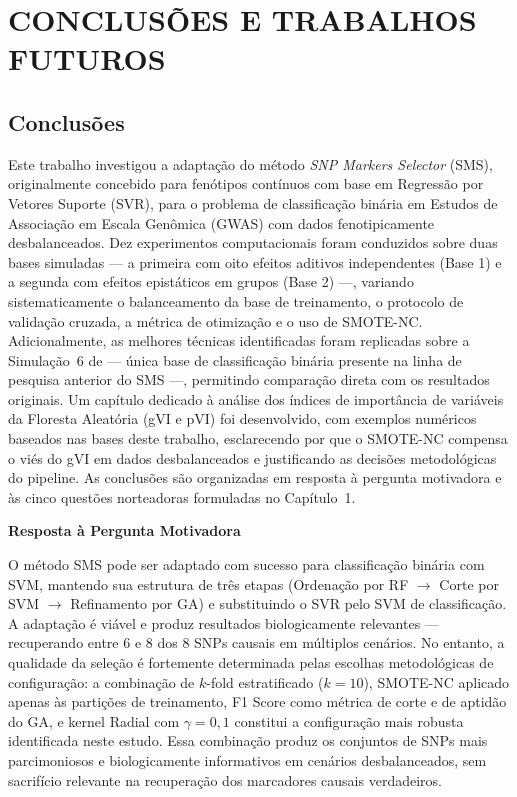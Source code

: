 \documentclass[
    12pt,
    a4paper,
    oneside,
    english,
    french,
    spanish,
    brazil
    ]{abntex2}
\newcommand{\novo}[1]{\textcolor{corNova}{#1}}
\begin{document}
\chapter{\textbf{CONCLUSÕES E TRABALHOS FUTUROS}}
\label{cap:conclusoes}

\section*{Conclusões}

Este trabalho investigou a adaptação do método \textit{SNP Markers Selector} (SMS), originalmente concebido para fenótipos contínuos com base em Regressão por Vetores Suporte (SVR), para o problema de classificação binária em Estudos de Associação em Escala Genômica (GWAS) com dados fenotipicamente desbalanceados. Dez experimentos computacionais foram conduzidos sobre duas bases simuladas --- a primeira com oito efeitos aditivos independentes (Base 1) e a segunda com efeitos epistáticos em grupos (Base 2) ---, variando sistematicamente o balanceamento da base de treinamento, o protocolo de validação cruzada, a métrica de otimização e o uso de SMOTE-NC. Adicionalmente, as melhores técnicas identificadas foram replicadas sobre a Simulação~6 de  --- única base de classificação binária presente na linha de pesquisa anterior do SMS ---, permitindo comparação direta com os resultados originais. Um capítulo dedicado à análise dos índices de importância de variáveis da Floresta Aleatória (gVI e pVI) foi desenvolvido, com exemplos numéricos baseados nas bases deste trabalho, esclarecendo por que o SMOTE-NC compensa o viés do gVI em dados desbalanceados e justificando as decisões metodológicas do pipeline. As conclusões são organizadas em resposta à pergunta motivadora e às cinco questões norteadoras formuladas no Capítulo~1.

\bigskip
\noindent\textbf{Resposta à Pergunta Motivadora}

\novo{O método SMS pode ser adaptado com sucesso para classificação binária com SVM, mantendo sua estrutura de três etapas (Ordenação por RF $\to$ Corte por SVM $\to$ Refinamento por GA) e substituindo o SVR pelo SVM de classificação. A adaptação é viável e produz resultados biologicamente relevantes --- recuperando entre 6 e 8 dos 8 SNPs causais em múltiplos cenários. No entanto, a qualidade da seleção é fortemente determinada pelas escolhas metodológicas de configuração: a combinação de $k$-fold estratificado ($k=10$), SMOTE-NC aplicado apenas às partições de treinamento, F1 Score como métrica de corte e de aptidão do GA, e kernel Radial com $\gamma = 0{,}1$ constitui a configuração mais robusta identificada neste estudo. Essa combinação produz os conjuntos de SNPs mais parcimoniosos e biologicamente informativos em cenários desbalanceados, sem sacrifício relevante na recuperação dos marcadores causais verdadeiros.}
\end{document}
